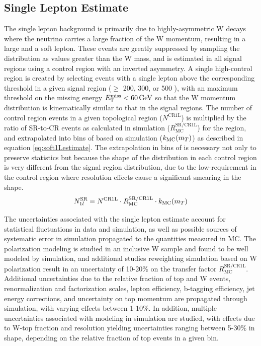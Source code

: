 \subsection{Single Lepton Estimate}
\label{subsec:soft1Lestimate}
The single lepton background is primarily due to highly-asymmetric W decays where the neutrino carries a large fraction of the W momentum, resulting in a large \MET and a soft lepton. These events are greatly suppressed by sampling the \mt distribution as values greater than the W mass, and is estimated in all signal regions using a control region with an inverted asymmetry. A single high-\pt control region is created by selecting events with a single lepton above the corresponding \MET threshold in a given signal region (\pt $\geq$ 200, 300, or 500 \GeV), with an maximum threshold on the missing energy $E_{\mathrm{T}}^{\text{miss}} <60\,\text{Ge\hspace{-.08em}V}$ so that the W momentum distribution is kinematically similar to that in the signal regions. The number of control region events in a given topological region ($N^{\text{CR1L}}$) is multiplied by the ratio of SR-to-CR events as calculated in simulation ($R_{\text{MC}}^{\text{SR/CR1L}}$) for the region, and extrapolated into bins of \mt based on simulation ($k_{\text{MC}}(m_T)$) as described in equation \ref{eq:soft1Lestimate}. The extrapolation in bins of \mt is necessary not only to preserve statistics but because the shape of the \mt distribution in each control region is very different from the signal region distribution, due to the low-\MET requirement in the control region where resolution effects cause a significant smearing in the \mt shape.
\begin{equation}
	N_{1l}^{\text{SR}} = N^{\text{CR1L}} \cdot R_{\text{MC}}^{\text{SR/CR1L}} \cdot k_{\text{MC}}(m_T)
	\label{eq:soft1Lestimate}
\end{equation}

The uncertainties associated with the single lepton estimate account for statistical fluctuations in data and simulation, as well as possible sources of systematic error in simulation propagated to the quantities measured in MC. The polarization modeling is studied in an inclusive W sample and found to be well modeled by simulation, and additional studies reweighting simulation based on W polarization result in an uncertainty of 10-20\% on the transfer factor $R_{\text{MC}}^{\text{SR/CR1L}}$. Additional uncertainties due to the relative fraction of top and W events, renormalization and factorization scales, lepton efficiency, b-tagging efficiency, jet energy corrections, and uncertainty on top momentum are propagated through simulation, with varying effects between 1-10\%. In addition, multiple uncertainties associated with \mt modeling in simulation are studied, with effects due to W-top fraction and \MET resolution yielding uncertainties ranging between 5-30\% in \mt shape, depending on the relative fraction of top events in a given bin.


